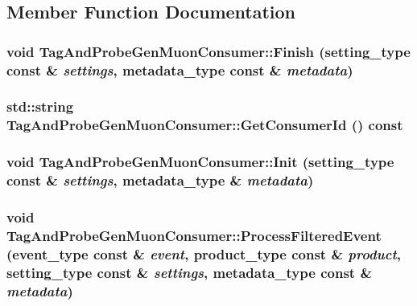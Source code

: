 \subsection{Member Function Documentation}
\hypertarget{classTagAndProbeGenMuonConsumer_a0ad1d7b73164dbdbe2803022bc364ea4}{
\subsubsection[{Finish}]{\setlength{\rightskip}{0pt plus 5cm}void TagAndProbeGenMuonConsumer::Finish (setting\_\-type const \& {\em settings}, \/  metadata\_\-type const \& {\em metadata})}}
\label{classTagAndProbeGenMuonConsumer_a0ad1d7b73164dbdbe2803022bc364ea4}
\hypertarget{classTagAndProbeGenMuonConsumer_a06be15366a26bb5e4bbdc81bb72094aa}{
\subsubsection[{GetConsumerId}]{\setlength{\rightskip}{0pt plus 5cm}std::string TagAndProbeGenMuonConsumer::GetConsumerId () const}}
\label{classTagAndProbeGenMuonConsumer_a06be15366a26bb5e4bbdc81bb72094aa}
\hypertarget{classTagAndProbeGenMuonConsumer_aab29f635021f3f1685b91c7a0fe1cb73}{
\subsubsection[{Init}]{\setlength{\rightskip}{0pt plus 5cm}void TagAndProbeGenMuonConsumer::Init (setting\_\-type const \& {\em settings}, \/  metadata\_\-type \& {\em metadata})}}
\label{classTagAndProbeGenMuonConsumer_aab29f635021f3f1685b91c7a0fe1cb73}
\hypertarget{classTagAndProbeGenMuonConsumer_adf99bf50f63088f944c9f74e17afed6d}{
\subsubsection[{ProcessFilteredEvent}]{\setlength{\rightskip}{0pt plus 5cm}void TagAndProbeGenMuonConsumer::ProcessFilteredEvent (event\_\-type const \& {\em event}, \/  product\_\-type const \& {\em product}, \/  setting\_\-type const \& {\em settings}, \/  metadata\_\-type const \& {\em metadata})}}
\label{classTagAndProbeGenMuonConsumer_adf99bf50f63088f944c9f74e17afed6d}


